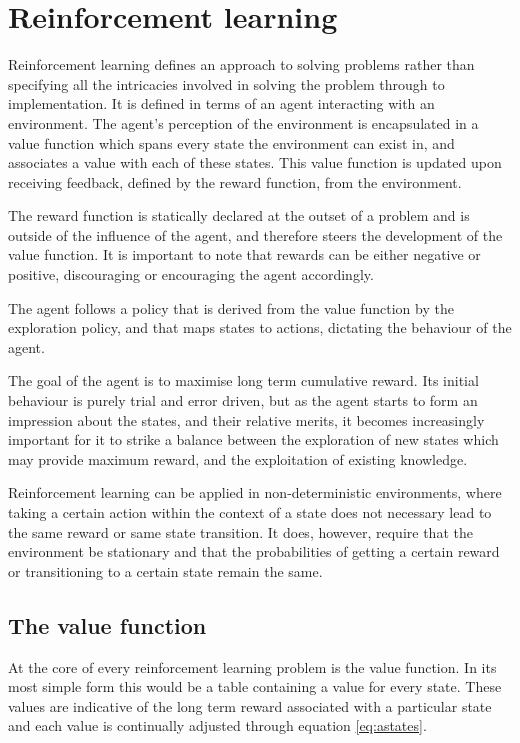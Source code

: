 \documentclass{rucsthesis}
\begin{document}
\section{Reinforcement learning}

Reinforcement learning defines an approach to solving problems rather than specifying all the intricacies involved in solving the problem through to implementation. It is defined in terms of an agent interacting with an environment. The agent's perception of the environment is encapsulated in a value function which spans every state the environment can exist in, and associates a value with each of these states. This value function is updated upon receiving feedback, defined by the reward function, from the environment. 

The reward function is statically declared at the outset of a problem and is outside of the influence of the agent, and therefore steers the development of the value function. It is important to note that rewards can be either negative or positive, discouraging or encouraging the agent accordingly. 

The agent follows a policy that is derived from the value function by the exploration policy, and that maps states to actions, dictating the behaviour of the agent\citep{suttonbarto}.

The goal of the agent is to maximise long term cumulative reward. Its initial behaviour is purely trial and error driven, but as the agent starts to form an impression about the states, and their relative merits, it becomes increasingly important for it to strike a balance between the exploration of new states which may provide maximum reward, and the exploitation of existing knowledge\citep{suttonbarto}.

Reinforcement learning can be applied in non-deterministic environments, where taking a certain action within the context of a state does not necessary lead to the same reward or same state transition. It does, however, require that the environment be stationary and that the probabilities of getting a certain reward or transitioning to a certain state remain the same\citep{kaelbling96reinforcement}. 

\subsection{The value function}

At the core of every reinforcement learning problem is the value function. In its most simple form this would be a table containing a value for every state. These values are indicative of the long term reward associated with a particular state and each value is continually adjusted through equation \ref{eq:astates}. 
\end{document}
